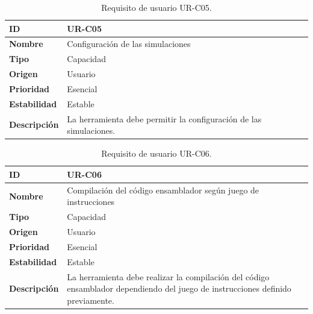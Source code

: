 \begin{center}
\begin{table}[htbp]
\centering
\begin{tabular}{@{}p{2.5cm} p{9cm}@{}} 
\toprule
\textbf{ID} 				& UR-C05 \\
\midrule
\textbf{Nombre} 			& Configuración de las simulaciones \\
\midrule
\textbf{Tipo} 			& Capacidad \\
\midrule
\textbf{Origen} 			& Usuario \\
\midrule
\textbf{Prioridad}		& Esencial \\
\midrule
\textbf{Estabilidad} 		& Estable \\
\midrule
\textbf{Descripción} 	& La herramienta debe permitir la configuración de las simulaciones. \\
\bottomrule
\end{tabular}
\caption{Requisito de usuario UR-C05.}
\label{tab:urc05}
\end{table}
\end{center}

\begin{center}
\begin{table}[htbp]
\centering
\begin{tabular}{@{}p{2.5cm} p{9cm}@{}} 
\toprule
\textbf{ID} 				& UR-C06 \\
\midrule
\textbf{Nombre} 			& Compilación del código ensamblador según juego de instrucciones \\
\midrule
\textbf{Tipo} 			& Capacidad \\
\midrule
\textbf{Origen} 			& Usuario \\
\midrule
\textbf{Prioridad}		& Esencial \\
\midrule
\textbf{Estabilidad} 		& Estable \\
\midrule
\textbf{Descripción} 	& La herramienta debe realizar la compilación del código ensamblador dependiendo del juego de instrucciones definido previamente. \\
\bottomrule
\end{tabular}
\caption{Requisito de usuario UR-C06.}
\label{tab:urc06}
\end{table}
\end{center}

